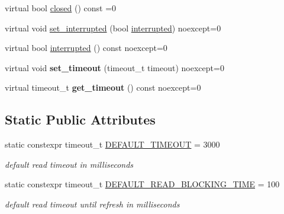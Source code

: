 \begin{DoxyCompactItemize}
virtual bool \hyperlink{structdevfix_1_1net_1_1socket_ae84cb7f6da7cb70c4e26cab16e17411e}{closed} () const =0
\item 
virtual void \hyperlink{structdevfix_1_1net_1_1socket_a3fa8d7dcd44e7740b29ad6674005eb5d}{set\+\_\+interrupted} (bool \hyperlink{structdevfix_1_1net_1_1socket_a7cfe151f1124d46fb19fad0c374c9352}{interrupted}) noexcept=0
\item 
virtual bool \hyperlink{structdevfix_1_1net_1_1socket_a7cfe151f1124d46fb19fad0c374c9352}{interrupted} () const noexcept=0
\item 
\mbox{\label{structdevfix_1_1net_1_1socket_ae1cf3b2c4f5d39225d6585c387f967d5}} 
virtual void {\bfseries set\+\_\+timeout} (timeout\+\_\+t timeout) noexcept=0
\item 
\mbox{\label{structdevfix_1_1net_1_1socket_afac86b6ad30a758ce590e7a144764967}} 
virtual timeout\+\_\+t {\bfseries get\+\_\+timeout} () const noexcept=0
\end{DoxyCompactItemize}
\subsection*{Static Public Attributes}
\begin{DoxyCompactItemize}
\item 
\mbox{\label{structdevfix_1_1net_1_1socket_a1bd6468be497aed208ad6d5632683a5d}} 
static constexpr timeout\+\_\+t \hyperlink{structdevfix_1_1net_1_1socket_a1bd6468be497aed208ad6d5632683a5d}{D\+E\+F\+A\+U\+L\+T\+\_\+\+T\+I\+M\+E\+O\+UT} = 3000
\begin{DoxyCompactList}\small\item\em default read timeout in milliseconds \end{DoxyCompactList}\item 
\mbox{\label{structdevfix_1_1net_1_1socket_a77c3214eb436d06825a4cc2aafcc63ce}} 
static constexpr timeout\+\_\+t \hyperlink{structdevfix_1_1net_1_1socket_a77c3214eb436d06825a4cc2aafcc63ce}{D\+E\+F\+A\+U\+L\+T\+\_\+\+R\+E\+A\+D\+\_\+\+B\+L\+O\+C\+K\+I\+N\+G\+\_\+\+T\+I\+ME} = 100
\begin{DoxyCompactList}\small\item\em default read timeout until refresh in milliseconds \end{DoxyCompactList}\end{DoxyCompactItemize}


